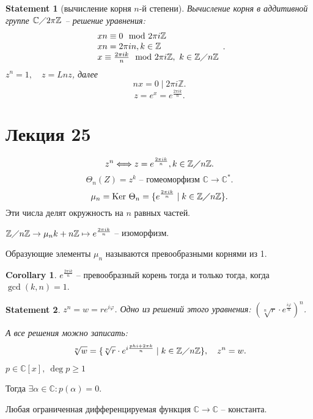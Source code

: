 \documentclass[11pt]{book}
\newcommand{\Z}{\mathbb{Z}}
\newcommand{\Cm}{\mathbb{C}}
\newcommand{\ke}{{\mathop{\text{\rm Ker}}}~}
\theoremstyle{definition}
\theoremstyle{plain}
\theoremstyle{plain}
\newtheorem*{st}{Statement}
\theoremstyle{definition}
\newtheorem*{cor}{Corollary}
\theoremstyle{remark}
\begin{document}
\begin{st}[вычисление корня $n$-й степени]
    Вычисление корня в аддитивной  группе $\Cm\diagup 2\pi\Z$  -- решение уравнения:
    \[
	\begin{array}{l}
	xn \equiv 0 \mod 2\pi i \Z\\
	xn = 2\pi i n, k \in  \Z \\
	x \equiv \frac{2\pi i k}{n} \mod 2\pi i \Z, ~ k \in  \Z\diagup n\Z
	\end{array}
    .\] 
    $z ^{n} = 1, \quad z = Ln z$,  далее
    \[
    nx = 0 \mid 2\pi i \Z
    .\] 
    \[
	z = e^{x}=e ^{\frac{2\pi ik}{n}}
    .\] 
\end{st}
\section{Лекция 25}
\[
    z^{n} \Longleftrightarrow z = e^{\frac{2 \pi  i k}{n}}, k \in  \Z \diagup n\Z
.\] 
\[
    \Theta_n (Z) = z^{k} \text{ -- гомеоморфизм }  \Cm \to  \Cm^{*}
.\] 
\[
    \mu_n = \ke \Theta_n = \{e ^{ \frac{2\pi i k}{n}} \mid k \in  \Z\diagup n\Z\}
.\] 
Эти числа делят окружность на $ n$ равных частей.

$ \Z \diagup  n \Z \to  \mu_n\\
k + n\Z \mapsto e ^{\frac{2\pi i k}{n}}$ -- изоморфизм.
\begin{defn}
    Образующие элементы $ \mu_n$ называются превообразными корнями из 1.
\end{defn}
\begin{cor}
    $ e^{\frac{2\pi i k}{n}}$ -- превообразный корень тогда и только тогда, когда $ \gcd(k, n) = 1$.
\end{cor}
\begin{st}
    $ z^{n} = w = r e^{i \varphi }$.
    Одно из решений этого уравнения: $ \left( \sqrt[n]{r} \cdot e ^{\frac{i \varphi }{n}} \right)^{n} $.

    А все решения можно записать:
    \[
	\sqrt[n]{w} = \{\sqrt[n]{r} \cdot e ^{i \frac{phi  + 2 \pi k}{n}} \mid k \in  \Z\diagup n\Z\}, \quad z^{n} = w
    .\] 
\end{st}
\begin{thm}
    $ p \in  \Cm[x], ~ \deg p \ge 1$

    Тогда $ \exists \alpha  \in  \Cm: p( \alpha ) = 0$.
\end{thm}
\begin{thm}[Лиувилль]
    Любая ограниченная дифференцируемая функция $ \Cm \to  \Cm$ -- константа.
\end{thm}
\end{document}
